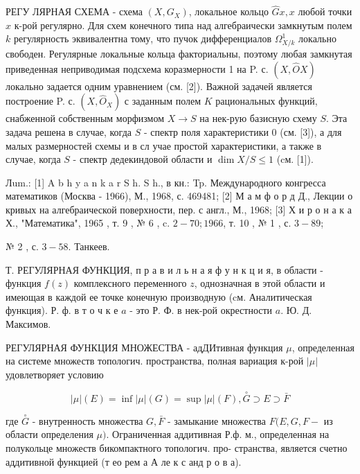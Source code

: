 \documentclass[10pt]{article}
\begin{document}
РЕГУ ЛЯРНАЯ СХЕМА - схема $\left(X, G_{X}\right)$, локальное кольцо $\widehat{G} x, x$ любой точки $x$ к-рой регулярно. Для схем конечного типа над алгебраически замкнутым полем $k$ регулярность эквивалентна тому, что пучок дифференциалов $\Omega_{X / k}^{1}$ локально свободен. Регулярные локальные кольца факториальны, поэтому любая замкнутая приведенная неприводимая подсхема коразмерности 1 на P. с. $(X, \widehat{O} X)$ локально задается одним уравнением (см. [2]). Важной задачей является построение P. с. $\left(X, \widehat{O}_{X}\right)$ с заданным полем $K$ рациональных функций, снабженной собственным морфизмом $X \rightarrow S$ на нек-рую базисную схему $S$. Эта задача решена в случае, когда $S$ - спектр поля характеристики 0 (см. [3]), а для малых размерностей схемы и в сл учае простой характеристики, а также в случае, когда $S$ - спектр дедекиндовой области и $\operatorname{dim} X / S \leqslant 1$ (cм. [1]).



Лum.: [1] A b h y a n k a r S h. S h., в кн.: Tp. Международного конгресса математиков (Москва - 1966), М., 1968, с. 469481; [2] М а м ф о р д Д., Лекции о кривых на алгебраической поверхности, пер. с англ., М., 1968; [3] Х и р о н а к а Х., "Математика", 1965 , т. 9 , № 6 , c. $2-70 ; 1966$, т. 10 , № 1 , с. $3-89$;

№ 2 , с. $3-58$. Танкеев.

Т. РЕГУЛЯРНАЯ ФУНКЦИЯ, п р а в и л ь н а я ф у н к ц и я, в области - функция $f(z)$ комплексного переменного $z$, однозначная в этой области и имеющая в каждой ее точке конечную производную (cм. Аналитическая функция). Р. ф. в т о ч к е $a$ - это Р. Ф. в нек-рой окрестности $a$. Ю. Д. Максимов.



РЕГУЛЯРНАЯ ФУНКЦИЯ МНОЖЕСТВА - адДИтивная функция $\mu$, определенная на системе множеств топологич. пространства, полная вариация к-рой $|\mu|$ удовлетворяет условию



\[

|\mu|(E)=\inf |\mu|(G)=\sup |\mu|(F), \stackrel{\circ}{G} \supset E \supset \bar{F}

\]



где $\stackrel{\circ}{G}$ - внутренность множества $G, \bar{F}$ - замыкание множества $F(E, G, F-$ из области определения $\mu)$. Ограниченная аддитивная Р.ф. м., определенная на полукольце множеств бикомпактного топологич. про- странства, является счетно аддитивной функцией (т ео рем а А ле к с анд р о в а).
\end{document}
